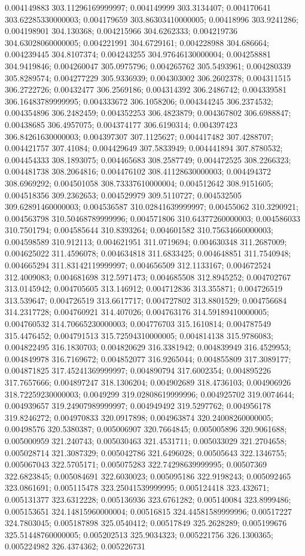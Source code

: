 0.004149883 303.11296169999997; 0.004149999 303.3134407; 0.004170641 303.62285330000003; 0.004179659 303.86303410000005; 0.00418996 303.9241286; 0.004198901 304.130368; 0.004215966 304.6262333; 0.004219736 304.63028060000005; 0.004221991 304.6729161; 0.004228988 304.686664; 0.004239445 304.8107374; 0.004243255 304.97646130000004; 0.004258881 304.9419846; 0.004260047 305.0975796; 0.004265762 305.5493961; 0.004280339 305.8289574; 0.004277229 305.9336939; 0.004303002 306.2602378; 0.004311515 306.2722726; 0.00432477 306.2569186; 0.004314392 306.2486742; 0.004339581 306.16483789999995; 0.004333672 306.1058206; 0.004344245 306.2374532; 0.004354896 306.2482459; 0.004352253 306.4823879; 0.004367802 306.6988847; 0.00438685 306.4957075; 0.004374177 306.6190314; 0.004397423 306.84261630000003; 0.004397307 307.1125627; 0.004417482 307.4288707; 0.004421757 307.41084; 0.004429649 307.5833949; 0.004441894 307.8780532; 0.004454333 308.1893075; 0.004465683 308.2587749; 0.004472525 308.2266323; 0.004481738 308.2064816; 0.004476102 308.41128630000003; 0.004494372 308.6969292; 0.004501058 308.73337610000004; 0.004512642 308.9151605; 0.004518356 309.2362653; 0.004529979 309.5110727; 0.004532505 309.62891460000003; 0.004536587 310.02841639999997; 0.00455062 310.3290921; 0.004563798 310.50468789999996; 0.004571806 310.64377260000003; 0.004586033 310.7501794; 0.004585644 310.8393264; 0.004601582 310.75634660000003; 0.004598589 310.912113; 0.004621951 311.0719694; 0.004630348 311.2687009; 0.004625022 311.4596078; 0.004634818 311.6833425; 0.004648851 311.7540948; 0.004665294 311.83142119999997; 0.004656509 312.1133167; 0.004672524 312.4009083; 0.004681698 312.5971473; 0.004685508 312.8945252; 0.004702767 313.0145942; 0.004705605 313.146912; 0.004712836 313.355871; 0.004726519 313.539647; 0.004726519 313.6617717; 0.004727802 313.8801529; 0.004756684 314.2317728; 0.004760921 314.407026; 0.004763176 314.59189410000005; 0.004760532 314.70665230000003; 0.004776703 315.1610814; 0.004787549 315.4476452; 0.004791513 315.72594310000005; 0.004814138 315.9786083; 0.004822495 316.1830703; 0.004820629 316.3381942; 0.004839949 316.4529953; 0.004849978 316.7169672; 0.004852077 316.9265044; 0.004855809 317.3089177; 0.004871825 317.45241369999997; 0.004890794 317.6002354; 0.004895226 317.7657666; 0.004897247 318.1306204; 0.004902689 318.4736103; 0.004906926 318.72259230000003; 0.0049299 319.02808619999996; 0.004925702 319.0074644; 0.004939657 319.24907989999997; 0.004949492 319.5297762; 0.004956178 319.8246272; 0.004970833 320.0917898; 0.004963874 320.24008260000005; 0.00498576 320.5380387; 0.005006907 320.7664845; 0.005005896 320.9061688; 0.005000959 321.240743; 0.005030463 321.4531711; 0.005033029 321.2704658; 0.005028714 321.3087329; 0.005042786 321.6496028; 0.00505643 322.1346755; 0.005067043 322.5705171; 0.005075283 322.74298639999995; 0.00507369 322.6823845; 0.005084691 322.6030023; 0.005095186 322.9198243; 0.005092465 323.0861691; 0.005115478 323.25041539999995; 0.005124418 323.432671; 0.005131377 323.6312228; 0.005136936 323.6761282; 0.005140084 323.8999486; 0.005153651 324.14815960000004; 0.00516815 324.44581589999996; 0.00517227 324.7803045; 0.005187898 325.0540412; 0.00517849 325.2628289; 0.005199676 325.51448760000005; 0.005202513 325.9034323; 0.005221756 326.1300365; 0.005224982 326.4374362; 0.005226731 